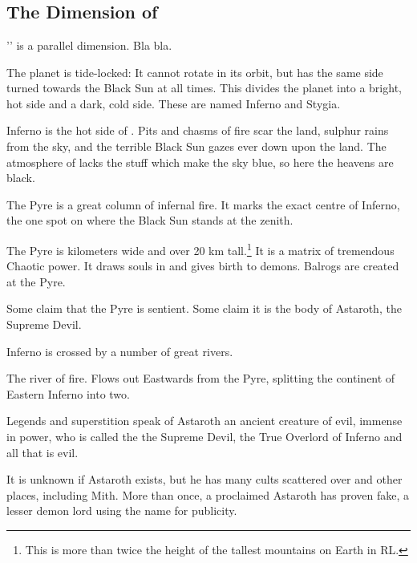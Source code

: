 \chapter{\Tuat{}}

\section{The Dimension of \Tuat{}}

'\Tuat{}' is a parallel dimension. Bla bla.

The planet \Tuat{} is tide-locked: It cannot rotate in its orbit, but has the same side turned towards the Black Sun at all times. This divides the planet into a bright, hot side and a dark, cold side. These are named Inferno and Stygia. 



Inferno is the hot side of \Tuat{}. Pits and chasms of fire scar the land, sulphur rains from the sky, and the terrible Black Sun gazes ever down upon the land. The atmosphere of \Tuat{} lacks the stuff which make the sky blue, so here the heavens are black. 

The Pyre is a great column of infernal fire. It marks the exact centre of Inferno, the one spot on \Tuat{} where the Black Sun stands at the zenith. 

The Pyre is kilometers wide and over 20 km tall.\footnote{This is more than twice the height of the tallest mountains on Earth in RL.} It is a matrix of tremendous Chaotic power. It draws souls in and gives birth to demons. Balrogs are created at the Pyre. 

Some claim that the Pyre is sentient. Some claim it is the body of Astaroth, the Supreme Devil.

Inferno is crossed by a number of great rivers. 

The river of fire. Flows out Eastwards from the Pyre, splitting the continent of Eastern Inferno into two. 


Legends and superstition speak of Astaroth an ancient creature of evil, immense in power, who is called the the Supreme Devil, the True Overlord of Inferno and all that is evil. 

It is unknown if Astaroth exists, but he has many cults scattered over \Tuat{} and other places, including Mith. More than once, a proclaimed Astaroth has proven fake, a lesser demon lord using the name for publicity. 

